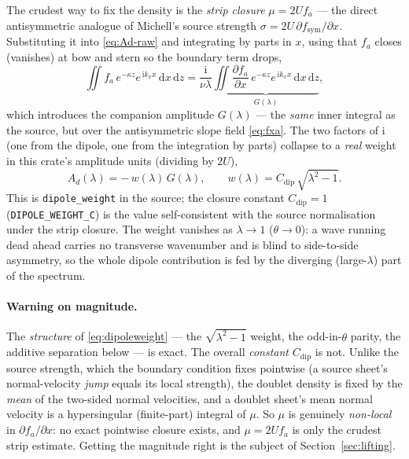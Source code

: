 \documentclass[11pt]{article}
\newcommand{\ii}{\mathrm{i}}
\newcommand{\dd}{\,\mathrm{d}}
\begin{document}
The crudest way to fix the density is the \emph{strip closure} $\mu = 2U f_a$
--- the direct antisymmetric analogue of Michell's source strength
$\sigma = 2U\,\partial f_{\mathrm{sym}}/\partial x$. Substituting it into
\eqref{eq:Ad-raw} and integrating by parts in $x$, using that $f_a$ closes
(vanishes) at bow and stern so the boundary term drops,
\begin{equation}
  \iint f_a\, e^{-\kappa z} e^{\,\ii k_x x}\dd x\dd z
   = \frac{\ii}{\nu\lambda}
     \underbrace{\iint \frac{\partial f_a}{\partial x}\,
       e^{-\kappa z} e^{\,\ii k_x x}\dd x\dd z}_{\textstyle G(\lambda)},
  \label{eq:ibp}
\end{equation}
which introduces the companion amplitude $G(\lambda)$ --- the \emph{same} inner
integral as the source, but over the antisymmetric slope field \eqref{eq:fxa}.
The two factors of $\ii$ (one from the dipole, one from the integration by
parts) collapse to a \emph{real} weight in this crate's amplitude units
(dividing by $2U$),
\begin{equation}
  \boxed{\;
  A_d(\lambda) = -\,w(\lambda)\,G(\lambda),
  \qquad
  w(\lambda) = C_{\mathrm{dip}}\,\sqrt{\lambda^2 - 1}. \;}
  \label{eq:dipoleweight}
\end{equation}
This is \texttt{dipole\_weight} in the source; the closure constant
$C_{\mathrm{dip}} = 1$ (\texttt{DIPOLE\_WEIGHT\_C}) is the value self-consistent
with the source normalisation under the strip closure. The weight vanishes as
$\lambda\to 1$ ($\theta\to 0$): a wave running dead ahead carries no transverse
wavenumber and is blind to side-to-side asymmetry, so the whole dipole
contribution is fed by the diverging (large-$\lambda$) part of the spectrum.

\paragraph{Warning on magnitude.} The \emph{structure} of
\eqref{eq:dipoleweight} --- the $\sqrt{\lambda^2-1}$ weight, the odd-in-$\theta$
parity, the additive separation below --- is exact. The overall
\emph{constant} $C_{\mathrm{dip}}$ is not. Unlike the source strength, which the
boundary condition fixes pointwise (a source sheet's normal-velocity
\emph{jump} equals its local strength), the doublet density is fixed by the
\emph{mean} of the two-sided normal velocities, and a doublet sheet's mean
normal velocity is a hypersingular (finite-part) integral of $\mu$. So $\mu$ is
genuinely \emph{non-local} in $\partial f_a/\partial x$: no exact pointwise
closure exists, and $\mu = 2U f_a$ is only the crudest strip estimate. Getting
the magnitude right is the subject of Section~\ref{sec:lifting}.
\end{document}
